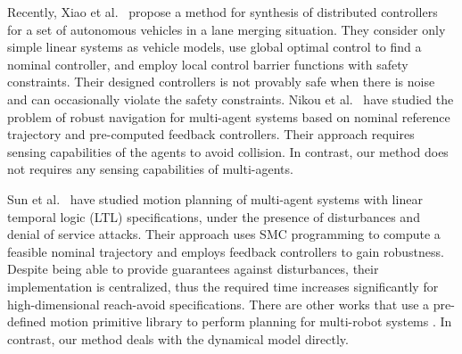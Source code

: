 \begin{enumerate}[(1)]
Recently, Xiao et al.\ \cite{xiao2019merging} propose a method for synthesis of distributed controllers for a 
set of autonomous vehicles in a lane merging situation. They consider only simple linear systems as vehicle models, use global optimal control to find a nominal controller, and employ local control barrier functions with safety constraints.
Their designed controllers is not provably safe when there is noise and can occasionally violate the safety constraints.
Nikou et al.\ \cite{Nikou2019} have studied the problem of robust navigation for multi-agent systems based on nominal reference trajectory and pre-computed feedback controllers. Their approach requires sensing capabilities of the agents to avoid collision. In contrast, our method does not requires any sensing capabilities of multi-agents.

Sun et al.\ \cite{sun2019} have studied motion planning of multi-agent systems with linear temporal logic (LTL) specifications, under the presence of disturbances and denial of service attacks.
Their approach uses SMC programming to compute a feasible nominal trajectory and employs feedback controllers to gain robustness.
Despite being able to provide guarantees against disturbances, their implementation is centralized, thus the required time increases significantly for high-dimensional reach-avoid specifications.%
%
There are other works that use a pre-defined motion primitive library to perform planning for multi-robot 
systems \cite{saha2016implan,BanusicMPSZ19pgcd,Gavran2017antlab,desai2017drona}. 
In contrast, our method deals with the dynamical model directly.


\end{enumerate}
